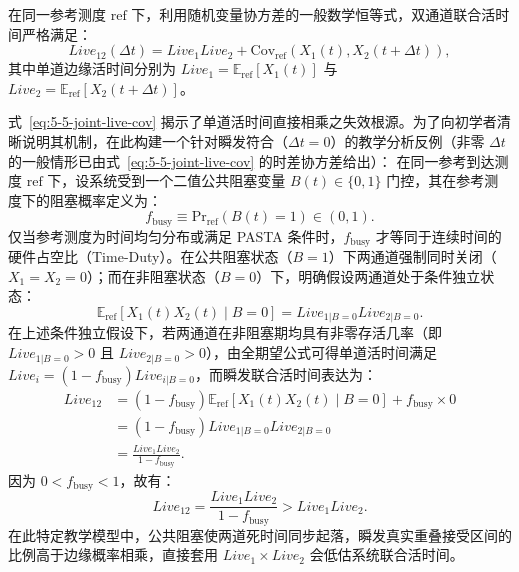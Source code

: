 在同一参考测度 $\mathrm{ref}$ 下，利用随机变量协方差的一般数学恒等式，双通道联合活时间严格满足：
\begin{equation}\label{eq:5-5-joint-live-cov}
Live_{12}(\Delta t) = Live_1 Live_2 + \mathrm{Cov}_{\mathrm{ref}}(X_1(t), X_2(t + \Delta t)),
\end{equation}
其中单道边缘活时间分别为 $Live_1 = \mathbb{E}_{\mathrm{ref}}[X_1(t)]$ 与 $Live_2 = \mathbb{E}_{\mathrm{ref}}[X_2(t + \Delta t)]$。

式~\eqref{eq:5-5-joint-live-cov} 揭示了单道活时间直接相乘之失效根源。为了向初学者清晰说明其机制，在此构建一个针对瞬发符合（$\Delta t = 0$）的教学分析反例（非零 $\Delta t$ 的一般情形已由式~\eqref{eq:5-5-joint-live-cov} 的时差协方差给出）：
在同一参考到达测度 $\mathrm{ref}$ 下，设系统受到一个二值公共阻塞变量 $B(t) \in \{0, 1\}$ 门控，其在参考测度下的阻塞概率定义为：
\begin{equation}\label{eq:5-5-fbusy-def}
f_{\mathrm{busy}} \equiv \mathrm{Pr}_{\mathrm{ref}}(B(t) = 1) \in (0, 1).
\end{equation}
仅当参考测度为时间均匀分布或满足 PASTA 条件时，$f_{\mathrm{busy}}$ 才等同于连续时间的硬件占空比（Time-Duty）。在公共阻塞状态（$B = 1$）下两通道强制同时关闭（$X_1 = X_2 = 0$）；而在非阻塞状态（$B = 0$）下，明确假设两通道处于条件独立状态：
\begin{equation}\label{eq:5-5-cond-indep}
\mathbb{E}_{\mathrm{ref}}[X_1(t) X_2(t) \mid B = 0] = Live_{1|B=0} Live_{2|B=0}.
\end{equation}
在上述条件独立假设下，若两通道在非阻塞期均具有非零存活几率（即 $Live_{1|B=0} > 0$ 且 $Live_{2|B=0} > 0$），由全期望公式可得单道活时间满足 $Live_i = (1 - f_{\mathrm{busy}}) Live_{i|B=0}$，而瞬发联合活时间表达为：
\begin{align}\label{eq:5-5-joint-cond-derived}
Live_{12} &= (1 - f_{\mathrm{busy}}) \mathbb{E}_{\mathrm{ref}}[X_1(t) X_2(t) \mid B = 0] + f_{\mathrm{busy}} \times 0 \nonumber \\
&= (1 - f_{\mathrm{busy}}) Live_{1|B=0} Live_{2|B=0} \nonumber \\
&= \frac{Live_1 Live_2}{1 - f_{\mathrm{busy}}}.
\end{align}
因为 $0 < f_{\mathrm{busy}} < 1$，故有：
\begin{equation}\label{eq:5-5-joint-bias-ineq}
Live_{12} = \frac{Live_1 Live_2}{1 - f_{\mathrm{busy}}} > Live_1 Live_2.
\end{equation}
在此特定教学模型中，公共阻塞使两道死时间同步起落，瞬发真实重叠接受区间的比例高于边缘概率相乘，直接套用 $Live_1 \times Live_2$ 会低估系统联合活时间。

